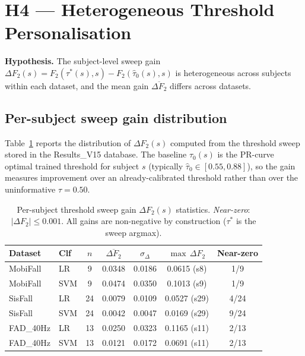 \section{H4 — Heterogeneous Threshold Personalisation}
\label{subsec:H4}

\textbf{Hypothesis.}  The subject-level sweep gain
$\Delta F_2(s) = F_2(\tau^*(s),s) - F_2(\hat\tau_0(s),s)$
is heterogeneous across subjects within each dataset, and the mean gain
$\overline{\Delta F_2}$ differs across datasets.

\subsection{Per-subject sweep gain distribution}
\label{subsubsec:sweep-dist}

Table~\ref{tab:sweep-dist} reports the distribution of $\Delta F_2(s)$ computed from
the threshold sweep stored in the Results\_V15 database.  The baseline
$\hat\tau_0(s)$ is the PR-curve optimal trained threshold for subject $s$
(typically $\hat\tau_0\in[0.55,0.88]$), so the gain measures improvement over an
already-calibrated threshold rather than over the uninformative $\tau=0.50$.

\begin{table}[h!]
\centering
\caption{Per-subject threshold sweep gain $\Delta F_2(s)$ statistics.
  \emph{Near-zero}: $|\Delta F_2|\leq0.001$.
  All gains are non-negative by construction ($\tau^*$ is the sweep argmax).}
\label{tab:sweep-dist}
\small
\begin{tabular}{llccccc}
\toprule
\textbf{Dataset} & \textbf{Clf} & $n$ & $\overline{\Delta F_2}$ &
  $\sigma_{\Delta}$ & $\max\,\Delta F_2$ & Near-zero \\
\midrule
MobiFall   & LR  &  9 & 0.0348 & 0.0186 & 0.0615 (s8)  & 1/9  \\
MobiFall   & SVM &  9 & 0.0474 & 0.0350 & 0.1013 (s9)  & 1/9  \\
SisFall    & LR  & 24 & 0.0079 & 0.0109 & 0.0527 (s29) & 4/24 \\
SisFall    & SVM & 24 & 0.0042 & 0.0047 & 0.0169 (s29) & 9/24 \\
FAD\_40Hz  & LR  & 13 & 0.0250 & 0.0323 & 0.1165 (s11) & 2/13 \\
FAD\_40Hz  & SVM & 13 & 0.0121 & 0.0172 & 0.0691 (s11) & 2/13 \\
\bottomrule
\end{tabular}
\end{table}


